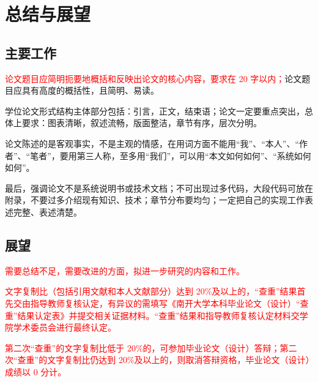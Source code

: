 \chapter{总结与展望} \label{chpt:conclusion}

\section{主要工作}

\textcolor{red}{论文题目应简明扼要地概括和反映出论文的核心内容，要求在 20 字以内；}论文题目应具有高度的概括性，且简明、易读。

学位论文形式结构主体部分包括：引言，正文，结束语；论文一定要重点突出，总体上要求：图表清晰，叙述流畅，版面整洁，章节有序，层次分明。

论文陈述的是客观事实，不是主观的情感，在用词方面不能用“我”、“本人”、“作者”、“笔者”，要用第三人称，至多用“我们”，可以用“本文如何如何”、“系统如何如何”。

最后，强调论文不是系统说明书或技术文档；不可出现过多代码，大段代码可放在附录，不要过多介绍现有知识、技术；章节分布要均匀；一定把自己的实现工作表述完整、表述清楚。

\section{展望}

\textcolor{red}{需要总结不足，需要改进的方面，拟进一步研究的内容和工作。}

\textcolor{red}{文字复制比（包括引用文献和本人文献部分）达到 20\%及以上的，“查重”结果首先交由指导教师复核认定，有异议的需填写《南开大学本科毕业论文（设计）“查重”结果认定表》并提交相关证据材料。“查重”结果和指导教师复核认定材料交学院学术委员会进行最终认定。}

\textcolor{red}{第二次“查重”的文字复制比低于 20\%的，可参加毕业论文（设计）答辩；第二次“查重”的文字复制比仍达到 20\%及以上的，则取消答辩资格，毕业论文（设计）成绩以 0 分计。}
